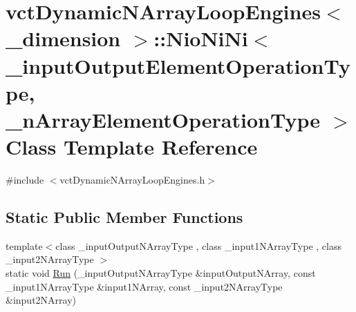\hypertarget{classvct_dynamic_n_array_loop_engines_1_1_nio_ni_ni}{\section{vct\-Dynamic\-N\-Array\-Loop\-Engines$<$ \-\_\-dimension $>$\-:\-:Nio\-Ni\-Ni$<$ \-\_\-input\-Output\-Element\-Operation\-Type, \-\_\-n\-Array\-Element\-Operation\-Type $>$ Class Template Reference}
\label{classvct_dynamic_n_array_loop_engines_1_1_nio_ni_ni}
}


{\ttfamily \#include $<$vct\-Dynamic\-N\-Array\-Loop\-Engines.\-h$>$}

\subsection*{Static Public Member Functions}
\begin{DoxyCompactItemize}
\item 
{\footnotesize template$<$class \-\_\-input\-Output\-N\-Array\-Type , class \-\_\-input1\-N\-Array\-Type , class \-\_\-input2\-N\-Array\-Type $>$ }\\static void \hyperlink{classvct_dynamic_n_array_loop_engines_1_1_nio_ni_ni_a053c4648b8ea9c5fa4fe592246a9f765}{Run} (\-\_\-input\-Output\-N\-Array\-Type \&input\-Output\-N\-Array, const \-\_\-input1\-N\-Array\-Type \&input1\-N\-Array, const \-\_\-input2\-N\-Array\-Type \&input2\-N\-Array)
\end{DoxyCompactItemize}


